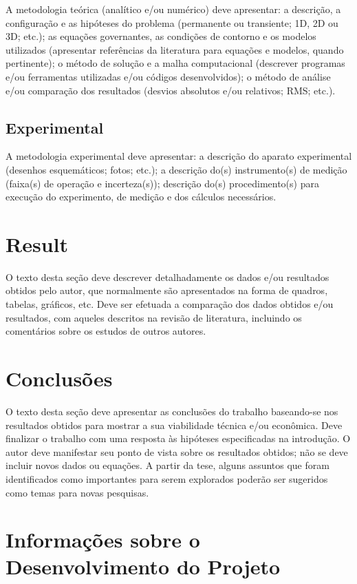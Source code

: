 \documentclass[%
  article,%
  10pt,%
  a4paper,%
  fleqn,%
  oneside,%
  sumario = tradicional,%
  chapter = TITLE,%
  section = TITLE,%
]{abntex2}
\begin{document}
A metodologia teórica (analítico e/ou numérico) deve apresentar: a descrição, a configuração e as hipóteses do problema (permanente ou transiente; 1D, 2D ou 3D; etc.); as equações governantes, as condições de contorno e os modelos utilizados (apresentar referências da literatura para equações e modelos, quando pertinente); o método de solução e a malha computacional (descrever programas e/ou ferramentas utilizadas e/ou códigos desenvolvidos); o método de análise e/ou comparação dos resultados (desvios absolutos e/ou relativos; RMS; etc.).

\subsection{Experimental}\label{ssec:exp}

A metodologia experimental deve apresentar: a descrição do aparato experimental (desenhos esquemáticos; fotos; etc.); a descrição do(s) instrumento(s) de medição (faixa(s) de operação e incerteza(s)); descrição do(s) procedimento(s) para execução do experimento, de medição e dos cálculos necessários.

\section{Result}\label{sec:res}

O texto desta seção deve descrever detalhadamente os dados e/ou resultados obtidos pelo autor, que normalmente são apresentados na forma de quadros, tabelas, gráficos, etc. Deve ser efetuada a comparação dos dados obtidos e/ou resultados, com aqueles descritos na revisão de literatura, incluindo os comentários sobre os estudos de outros autores.

\section{Conclusões}\label{sec:concl}

O texto desta seção deve apresentar as conclusões do trabalho baseando-se nos resultados obtidos para mostrar a sua viabilidade técnica e/ou econômica. Deve finalizar o trabalho com uma resposta às hipóteses especificadas na introdução. O autor deve manifestar seu ponto de vista sobre os resultados obtidos; não se deve incluir novos dados ou equações. A partir da tese, alguns assuntos que foram identificados como importantes para serem explorados poderão ser sugeridos como temas para novas pesquisas.

\section{Informações sobre o Desenvolvimento do Projeto}\label{sec:infoproj}
\end{document}
